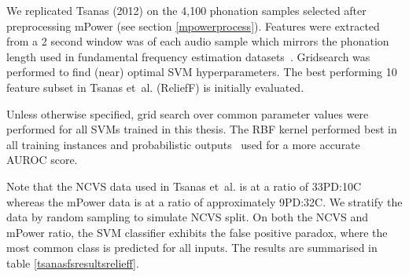 \documentclass[12pt, twoside]{book}
\begin{document}
We replicated Tsanas (2012) on the 4,100 phonation samples selected after preprocessing mPower (see section \ref{mpowerprocess}). Features were extracted from a 2 second window was of each audio sample which mirrors the phonation length used in fundamental frequency estimation datasets~\cite{f0estimation}. Gridsearch was performed to find (near) optimal SVM hyperparameters. The best performing 10 feature subset in Tsanas et~al. (ReliefF) is initially evaluated.

\begin{highlight}
	Unless otherwise specified, grid search over common parameter values were performed for all SVMs trained in this thesis. The RBF kernel performed best in all training instances and probabilistic outputs~\cite{svmprobabilistic} used for a more accurate AUROC score.
\end{highlight}

Note that the NCVS data used in Tsanas et~al. is at a ratio of 33PD:10C whereas the mPower data is at a ratio of approximately 9PD:32C. We stratify the data by random sampling to simulate NCVS split. On both the NCVS and mPower ratio, the SVM classifier exhibits the false positive paradox, where the most common class is predicted for all inputs. The results are summarised in table \ref{tsanasfsresultsrelieff}. 
\end{document}
